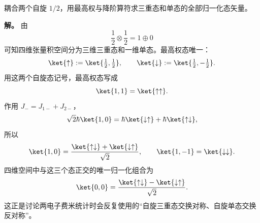 \begin{example}[两个自旋 $1/2$]
耦合两个自旋 $1/2$，用最高权与降阶算符求三重态和单态的全部归一化态矢量。

\textbf{解。} 由
\[
\frac12\otimes\frac12=1\oplus0
\]
可知四维张量积空间分为三维三重态和一维单态。最高权态唯一：
\[
\ket{\uparrow}:=\ket{\tfrac12,\tfrac12},\qquad
\ket{\downarrow}:=\ket{\tfrac12,-\tfrac12}.
\]
用这两个自旋态记号，最高权态写成
\[
\ket{1,1}=\ket{\uparrow\uparrow}.
\]
作用 $J_-=J_{1-}+J_{2-}$，
\[
\sqrt2\hbar\ket{1,0}
=\hbar\ket{\downarrow\uparrow}
 +\hbar\ket{\uparrow\downarrow},
\]
所以
\[
\ket{1,0}=\frac{\ket{\uparrow\downarrow}+\ket{\downarrow\uparrow}}{\sqrt2},
\qquad
\ket{1,-1}=\ket{\downarrow\downarrow}.
\]
四维空间中与这三个态正交的唯一归一化组合为
\[
\ket{0,0}
=\frac{\ket{\uparrow\downarrow}-\ket{\downarrow\uparrow}}{\sqrt2}.
\]
这正是讨论两电子费米统计时会反复使用的“自旋三重态交换对称、自旋单态交换反对称”。
\end{example}

